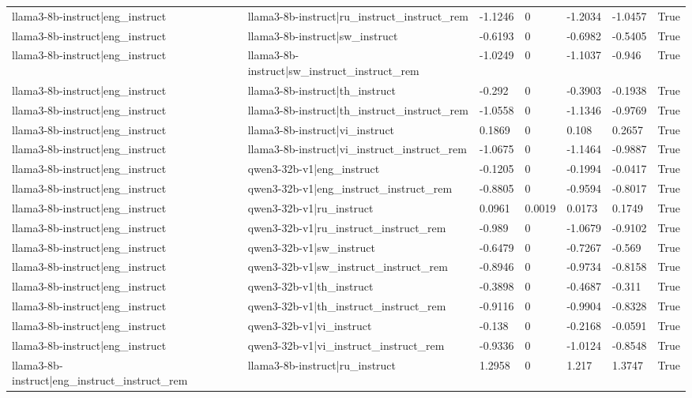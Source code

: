 \begin{table}
\begin{tabular}{llllllr}
llama3-8b-instruct|eng_instruct & llama3-8b-instruct|ru_instruct_instruct_rem & -1.1246 & 0 & -1.2034 & -1.0457 & True \\
llama3-8b-instruct|eng_instruct & llama3-8b-instruct|sw_instruct & -0.6193 & 0 & -0.6982 & -0.5405 & True \\
llama3-8b-instruct|eng_instruct & llama3-8b-instruct|sw_instruct_instruct_rem & -1.0249 & 0 & -1.1037 & -0.946 & True \\
llama3-8b-instruct|eng_instruct & llama3-8b-instruct|th_instruct & -0.292 & 0 & -0.3903 & -0.1938 & True \\
llama3-8b-instruct|eng_instruct & llama3-8b-instruct|th_instruct_instruct_rem & -1.0558 & 0 & -1.1346 & -0.9769 & True \\
llama3-8b-instruct|eng_instruct & llama3-8b-instruct|vi_instruct & 0.1869 & 0 & 0.108 & 0.2657 & True \\
llama3-8b-instruct|eng_instruct & llama3-8b-instruct|vi_instruct_instruct_rem & -1.0675 & 0 & -1.1464 & -0.9887 & True \\
llama3-8b-instruct|eng_instruct & qwen3-32b-v1|eng_instruct & -0.1205 & 0 & -0.1994 & -0.0417 & True \\
llama3-8b-instruct|eng_instruct & qwen3-32b-v1|eng_instruct_instruct_rem & -0.8805 & 0 & -0.9594 & -0.8017 & True \\
llama3-8b-instruct|eng_instruct & qwen3-32b-v1|ru_instruct & 0.0961 & 0.0019 & 0.0173 & 0.1749 & True \\
llama3-8b-instruct|eng_instruct & qwen3-32b-v1|ru_instruct_instruct_rem & -0.989 & 0 & -1.0679 & -0.9102 & True \\
llama3-8b-instruct|eng_instruct & qwen3-32b-v1|sw_instruct & -0.6479 & 0 & -0.7267 & -0.569 & True \\
llama3-8b-instruct|eng_instruct & qwen3-32b-v1|sw_instruct_instruct_rem & -0.8946 & 0 & -0.9734 & -0.8158 & True \\
llama3-8b-instruct|eng_instruct & qwen3-32b-v1|th_instruct & -0.3898 & 0 & -0.4687 & -0.311 & True \\
llama3-8b-instruct|eng_instruct & qwen3-32b-v1|th_instruct_instruct_rem & -0.9116 & 0 & -0.9904 & -0.8328 & True \\
llama3-8b-instruct|eng_instruct & qwen3-32b-v1|vi_instruct & -0.138 & 0 & -0.2168 & -0.0591 & True \\
llama3-8b-instruct|eng_instruct & qwen3-32b-v1|vi_instruct_instruct_rem & -0.9336 & 0 & -1.0124 & -0.8548 & True \\
llama3-8b-instruct|eng_instruct_instruct_rem & llama3-8b-instruct|ru_instruct & 1.2958 & 0 & 1.217 & 1.3747 & True \\

\end{tabular}
\end{table}
